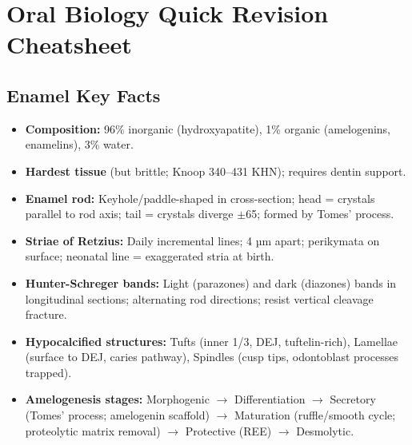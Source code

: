 \documentclass[11pt,a4paper]{article}
\begin{document}
\newpage
\appendix
\section{Oral Biology Quick Revision Cheatsheet}

\subsection{Enamel Key Facts}
\begin{itemize}[leftmargin=*]
    \item \textbf{Composition:} 96\% inorganic (hydroxyapatite), 1\% organic (amelogenins, enamelins), 3\% water.
    \item \textbf{Hardest tissue} (but brittle; Knoop 340--431 KHN); requires dentin support.
    \item \textbf{Enamel rod:} Keyhole/paddle-shaped in cross-section; head = crystals parallel to rod axis; tail = crystals diverge $\pm$65\textdegree; formed by Tomes' process.
    \item \textbf{Striae of Retzius:} Daily incremental lines; 4 µm apart; perikymata on surface; neonatal line = exaggerated stria at birth.
    \item \textbf{Hunter-Schreger bands:} Light (parazones) and dark (diazones) bands in longitudinal sections; alternating rod directions; resist vertical cleavage fracture.
    \item \textbf{Hypocalcified structures:} Tufts (inner 1/3, DEJ, tuftelin-rich), Lamellae (surface to DEJ, caries pathway), Spindles (cusp tips, odontoblast processes trapped).
    \item \textbf{Amelogenesis stages:} Morphogenic $\rightarrow$ Differentiation $\rightarrow$ Secretory (Tomes' process; amelogenin scaffold) $\rightarrow$ Maturation (ruffle/smooth cycle; proteolytic matrix removal) $\rightarrow$ Protective (REE) $\rightarrow$ Desmolytic.
\end{itemize}
\end{document}
